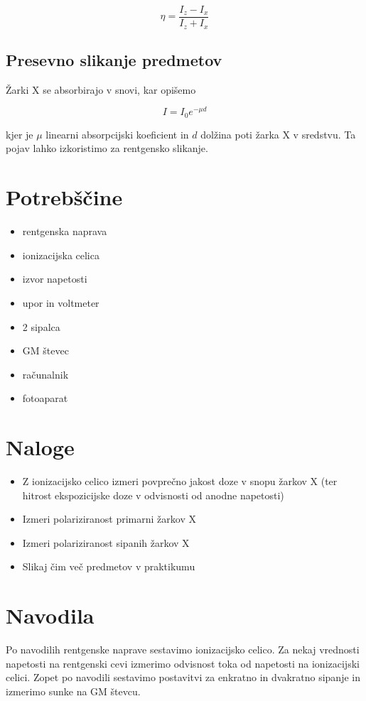 \documentclass[11pt]{article}
\begin{document}
\begin{equation}\label{eq:2}
 \eta = \frac{I_z - I_x}{I_z + I_x}
\end{equation}


\subsection{Presevno slikanje predmetov}\label{sec:orgbbc0edf}

Žarki X se absorbirajo v snovi, kar opišemo

\[I = I_0 e ^{- \mu d}
\]

kjer je \(\mu\) linearni absorpcijski koeficient in \(d\) dolžina poti žarka X v sredstvu. Ta pojav lahko izkoristimo za rentgensko slikanje.

\section{Potrebščine}\label{sec:org2919fcb}

\begin{itemize}
\item rentgenska naprava
\item ionizacijska celica
\item izvor napetosti
\item upor in voltmeter
\item 2 sipalca
\item GM števec
\item računalnik
\item fotoaparat
\end{itemize}

\section{Naloge}\label{sec:orge92d4a4}
\begin{itemize}
\item Z ionizacijsko celico izmeri povprečno jakost doze v snopu žarkov X (ter hitrost ekspozicijske doze v odvisnosti od anodne napetosti)
\item Izmeri polariziranost primarni žarkov X
\item Izmeri polariziranost sipanih žarkov X
\item Slikaj čim več predmetov v praktikumu
\end{itemize}

\section{Navodila}\label{sec:orgffcac4c}
Po navodilih rentgenske naprave sestavimo ionizacijsko celico.  Za nekaj vrednosti napetosti na rentgenski cevi izmerimo odvisnost toka od napetosti na ionizacijski celici. Zopet po navodili sestavimo postavitvi za enkratno in dvakratno sipanje in izmerimo sunke na GM števcu.
\end{document}
